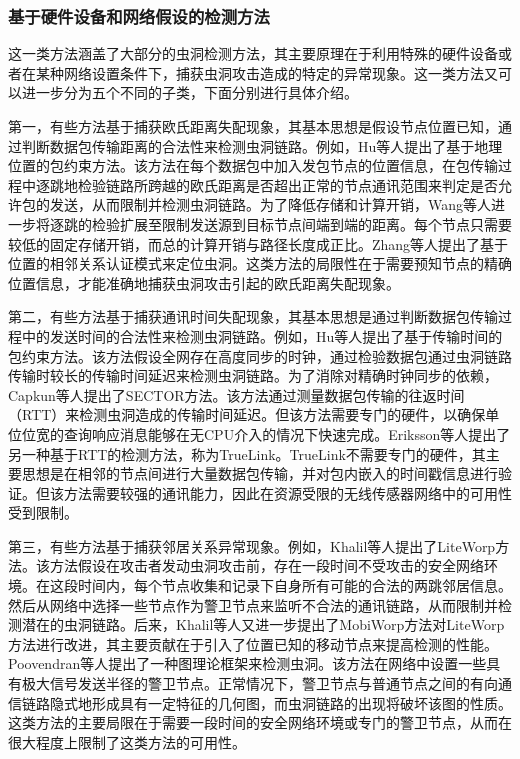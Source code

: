 \subsubsection{基于硬件设备和网络假设的检测方法}
这一类方法涵盖了大部分的虫洞检测方法，其主要原理在于利用特殊的硬件设备或者在某种网络设置条件下，捕获虫洞攻击造成的特定的异常现象。这一类方法又可以进一步分为五个不同的子类，下面分别进行具体介绍。

第一，有些方法基于捕获欧氏距离失配现象，其基本思想是假设节点位置已知，通过判断数据包传输距离的合法性来检测虫洞链路。例如，Hu等人提出了基于地理位置的包约束方法。该方法在每个数据包中加入发包节点的位置信息，在包传输过程中逐跳地检验链路所跨越的欧氏距离是否超出正常的节点通讯范围来判定是否允许包的发送，从而限制并检测虫洞链路。为了降低存储和计算开销，Wang等人进一步将逐跳的检验扩展至限制发送源到目标节点间端到端的距离。每个节点只需要较低的固定存储开销，而总的计算开销与路径长度成正比。Zhang等人提出了基于位置的相邻关系认证模式来定位虫洞。这类方法的局限性在于需要预知节点的精确位置信息，才能准确地捕获虫洞攻击引起的欧氏距离失配现象。

第二，有些方法基于捕获通讯时间失配现象，其基本思想是通过判断数据包传输过程中的发送时间的合法性来检测虫洞链路。例如，Hu等人提出了基于传输时间的包约束方法。该方法假设全网存在高度同步的时钟，通过检验数据包通过虫洞链路传输时较长的传输时间延迟来检测虫洞链路。为了消除对精确时钟同步的依赖，Capkun等人提出了SECTOR方法。该方法通过测量数据包传输的往返时间（RTT）来检测虫洞造成的传输时间延迟。但该方法需要专门的硬件，以确保单位位宽的查询响应消息能够在无CPU介入的情况下快速完成。Eriksson等人提出了另一种基于RTT的检测方法，称为TrueLink。TrueLink不需要专门的硬件，其主要思想是在相邻的节点间进行大量数据包传输，并对包内嵌入的时间戳信息进行验证。但该方法需要较强的通讯能力，因此在资源受限的无线传感器网络中的可用性受到限制。

第三，有些方法基于捕获邻居关系异常现象。例如，Khalil等人提出了LiteWorp方法。该方法假设在攻击者发动虫洞攻击前，存在一段时间不受攻击的安全网络环境。在这段时间内，每个节点收集和记录下自身所有可能的合法的两跳邻居信息。然后从网络中选择一些节点作为警卫节点来监听不合法的通讯链路，从而限制并检测潜在的虫洞链路。后来，Khalil等人又进一步提出了MobiWorp方法对LiteWorp方法进行改进，其主要贡献在于引入了位置已知的移动节点来提高检测的性能。Poovendran等人提出了一种图理论框架来检测虫洞。该方法在网络中设置一些具有极大信号发送半径的警卫节点。正常情况下，警卫节点与普通节点之间的有向通信链路隐式地形成具有一定特征的几何图，而虫洞链路的出现将破坏该图的性质。这类方法的主要局限在于需要一段时间的安全网络环境或专门的警卫节点，从而在很大程度上限制了这类方法的可用性。

